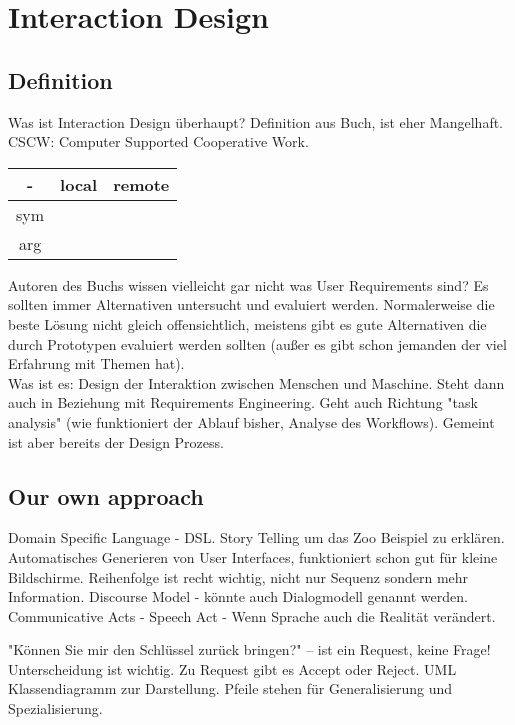 \section{Interaction Design}
\subsection{Definition}
Was ist Interaction Design überhaupt?
Definition aus Buch, ist eher Mangelhaft. CSCW: Computer Supported Cooperative Work.
\begin{center}
\begin{tabular}{ |c|c c| } 
 \hline
 - & local & remote \\ 
\hline
 sym &  &  \\ 
 arg &  &  \\ 
 \hline
\end{tabular}
\end{center}
Autoren des Buchs wissen vielleicht gar nicht was User Requirements sind?
Es sollten immer Alternativen untersucht und evaluiert werden. Normalerweise die
beste Lösung nicht gleich offensichtlich, meistens gibt es gute Alternativen die
durch Prototypen evaluiert werden sollten (außer es gibt schon jemanden der viel
Erfahrung mit Themen hat).
\\
Was ist es: Design der Interaktion zwischen Menschen und Maschine. Steht dann auch 
in Beziehung mit Requirements Engineering.
Geht auch Richtung "task analysis" (wie funktioniert der Ablauf bisher, Analyse des
Workflows). Gemeint ist aber bereits der Design Prozess. 
\\
\subsection{Our own approach}

Domain Specific Language - DSL. Story Telling um das Zoo Beispiel zu erklären. 
Automatisches Generieren von User Interfaces, funktioniert schon gut für kleine
Bildschirme.
Reihenfolge ist recht wichtig, nicht nur Sequenz sondern mehr Information.
Discourse Model - könnte auch Dialogmodell genannt werden.
Communicative Acts - Speech Act - Wenn Sprache auch die Realität verändert.

"Können Sie mir den Schlüssel zurück bringen?" -- ist ein Request, keine Frage!
Unterscheidung ist wichtig. Zu Request gibt es Accept oder Reject.
UML Klassendiagramm zur Darstellung. Pfeile stehen für Generalisierung und
Spezialisierung. 

